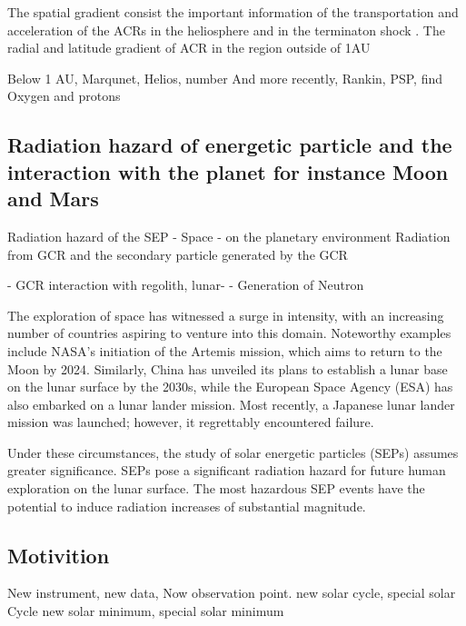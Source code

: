 The spatial gradient consist the important information of the transportation and acceleration of the ACRs in the heliosphere and in the terminaton shock \cite{Rankin 2020}. 
The radial and latitude gradient of ACR in the region outside of 1AU

Below 1 AU, Marqunet, Helios, number 
And more recently, Rankin, PSP, find Oxygen and protons

\subsection{Radiation hazard of energetic particle and the interaction with the planet for instance Moon and Mars}

Radiation hazard of the SEP 
- Space
- on the planetary environment
Radiation from GCR and the secondary particle generated by the GCR

- GCR interaction with regolith, lunar-
	- Generation of Neutron

The exploration of space has witnessed a surge in intensity, with an increasing number of countries aspiring to venture into this domain. Noteworthy examples include NASA's initiation of the Artemis mission, which aims to return to the Moon by 2024. Similarly, China has unveiled its plans to establish a lunar base on the lunar surface by the 2030s, while the European Space Agency (ESA) has also embarked on a lunar lander mission. Most recently, a Japanese lunar lander mission was launched; however, it regrettably encountered failure.

Under these circumstances, the study of solar energetic particles (SEPs) assumes greater significance. SEPs pose a significant radiation hazard for future human exploration on the lunar surface. The most hazardous SEP events have the potential to induce radiation increases of substantial magnitude.

\subsection{Motivition}
New instrument, new data, 
Now observation point.
new solar cycle, special solar Cycle
new solar minimum, special solar minimum
